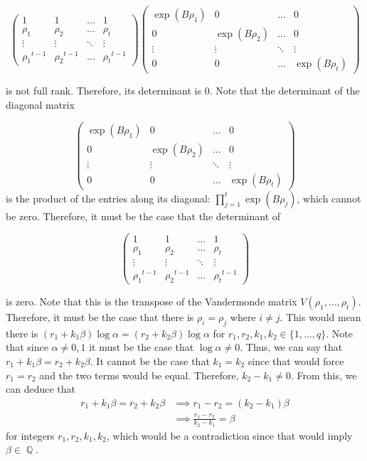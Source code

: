 \documentclass[a4paper, 11pt]{book}
\DeclareMathOperator{\Q}{\mathbb{Q}}
\begin{document}
\[
    \begin{pmatrix}
        1 & 1 & \hdots & 1 \\
        \rho_{1} & \rho_{2} & \hdots & {\rho_t} \\ 
        \vdots & \vdots & \ddots & \vdots \\
        {\rho_{1}}^{t-1} & {\rho_{2}}^{t-1} & \hdots & {\rho_t}^{t-1}
    \end{pmatrix} 
    \begin{pmatrix}
        \exp(B\rho_1) & 0 & \hdots & 0 \\
        0 & \exp(B\rho_2) & \hdots & 0 \\
        \vdots & \vdots & \ddots & \vdots \\
        0 & 0 & \hdots & \exp(B\rho_t) 
    \end{pmatrix}\] 

is not full rank. Therefore, its determinant is $0$. Note that the determinant of the diagonal matrix

\[\begin{pmatrix}
        \exp(B\rho_1) & 0 & \hdots & 0 \\
        0 & \exp(B\rho_2) & \hdots & 0 \\
        \vdots & \vdots & \ddots & \vdots \\
        0 & 0 & \hdots & \exp(B\rho_t) 
    \end{pmatrix}\]
is the product of the entries along its diagonal: $\prod\limits_{j=1}^{t}\exp(B\rho_{j})$, which cannot be zero. Therefore, it must be the case that the determinant of 

\[\begin{pmatrix}
        1 & 1 & \hdots & 1 \\
        \rho_{1} & \rho_{2} & \hdots & {\rho_t} \\ 
        \vdots & \vdots & \ddots & \vdots \\
        {\rho_{1}}^{t-1} & {\rho_{2}}^{t-1} & \hdots & {\rho_t}^{t-1}
    \end{pmatrix}\] 

    is zero. Note that this is the transpose of the Vandermonde matrix $V(\rho_1, \ldots, \rho_t)$. Therefore, it must be the case that there is $\rho_i = \rho_j$ where $i \neq j$. This would mean there is $\left(r_1 + k_1 \beta \right)\log \alpha = \left(r_2 + k_2 \beta\right) \log \alpha$ for $r_1, r_2, k_1, k_2 \in \{1, \ldots, q\}$. Note that since $\alpha \neq 0, 1$ it must be the case that $\log \alpha \neq 0$. Thus, we can say that $r_1 + k_1 \beta = r_2 + k_2 \beta$. It cannot be the case that $k_1 = k_2$ since that would force $r_1 = r_2$ and the two terms would be equal. Therefore, $k_2 - k_1 \neq 0$. From this, we can deduce that  
    \begin{align*}
        r_1 + k_1 \beta = r_2 + k_2 \beta &\implies r_1 - r_2 = (k_2 - k_1) \beta \\
                                          &\implies \frac{r_1 - r_2}{k_2 - k_1} = \beta
    \end{align*}
for integers $r_1, r_2, k_1, k_2$, which would be a contradiction since that would imply $\beta \in \Q$.\par
\end{document}

